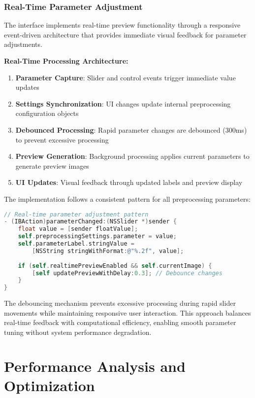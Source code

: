 \subsubsection{Real-Time Parameter Adjustment}

The interface implements real-time preview functionality through a responsive event-driven architecture that provides immediate visual feedback for parameter adjustments.

\textbf{Real-Time Processing Architecture:}
\begin{enumerate}
\item \textbf{Parameter Capture}: Slider and control events trigger immediate value updates
\item \textbf{Settings Synchronization}: UI changes update internal preprocessing configuration objects
\item \textbf{Debounced Processing}: Rapid parameter changes are debounced (300ms) to prevent excessive processing
\item \textbf{Preview Generation}: Background processing applies current parameters to generate preview images
\item \textbf{UI Updates}: Visual feedback through updated labels and preview display
\end{enumerate}

The implementation follows a consistent pattern for all preprocessing parameters:

\begin{lstlisting}[language=C,basicstyle=\footnotesize\ttfamily,frame=single,breaklines=true,columns=flexible]
// Real-time parameter adjustment pattern
- (IBAction)parameterChanged:(NSSlider *)sender {
    float value = [sender floatValue];
    self.preprocessingSettings.parameter = value;
    self.parameterLabel.stringValue = 
        [NSString stringWithFormat:@"%.2f", value];
    
    if (self.realtimePreviewEnabled && self.currentImage) {
        [self updatePreviewWithDelay:0.3]; // Debounce changes
    }
}
\end{lstlisting}

The debouncing mechanism prevents excessive processing during rapid slider movements while maintaining responsive user interaction. This approach balances real-time feedback with computational efficiency, enabling smooth parameter tuning without system performance degradation.

\section{Performance Analysis and Optimization}

